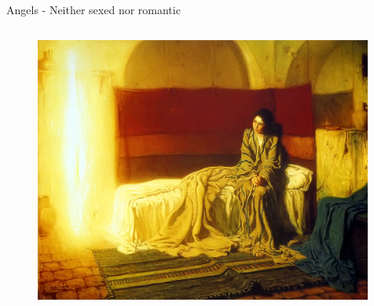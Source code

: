 \documentclass[xcolor=dvipsnames]{beamer}
\begin{document}
\begin{frame}[fragile]{Angels - Neither sexed nor romantic}
  \begin{columns}[T] %
    \begin{column}{0.8\textwidth}
      \begin{figure}[H]
        \centering
        \includegraphics[width=0.99\textwidth]{angel}
      \end{figure}
    \end{column}%
  \end{columns}
\end{frame}
\end{document}
